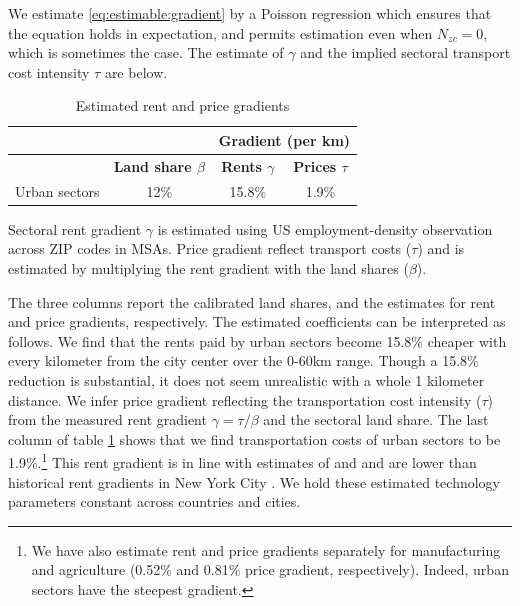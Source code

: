 \documentclass[12pt]{article}
\begin{document}
We estimate \eqref{eq:estimable:gradient} by a Poisson regression which ensures that the equation holds in expectation, and permits estimation even when $N_{zc}=0$, which is sometimes the case. The estimate of $\gamma$ and the implied sectoral transport cost intensity $\tau$ are below.

\begin{table}[h!]
  \begin{center}
  \caption{Estimated rent and price gradients}
    \begin{tabular}{rccc}
    \toprule
    \textbf{} & \textbf{} & \multicolumn{2}{c}{\textbf{Gradient (per km)}}\\
    \midrule
    \textbf{} & \textbf{Land share $\beta$ } & \textbf{Rents $\gamma$} & \textbf{Prices $\tau$} \\
    Urban sectors & 12\%  & 15.8\% & 1.9\% \\
    \bottomrule
    \end{tabular}%

  \end{center}
  \label{tab:EmpGrad}%

  \noindent \footnotesize{Sectoral rent gradient $\gamma$ is estimated using US employment-density observation across ZIP codes in MSAs. Price gradient reflect transport costs ($\tau$) and is estimated by multiplying the rent gradient with the land shares ($\beta$). }
\end{table}%

The three columns report the calibrated land shares, and the estimates for rent and price gradients, respectively. The estimated coefficients can be interpreted as follows. We find that the rents paid by urban sectors become 15.8\% cheaper with every kilometer from the city center over the 0-60km range. Though a 15.8\% reduction is substantial, it does not seem unrealistic with a whole 1 kilometer distance. We infer price gradient reflecting the transportation cost intensity ($\tau$) from the measured rent gradient $\gamma=\tau/\beta$ and the sectoral land share. The last column of table \ref{tab:EmpGrad} shows that we find transportation costs of urban sectors to be 1.9\%.\footnote{We have also estimate rent and price gradients separately for manufacturing and agriculture (0.52\% and 0.81\% price gradient, respectively). Indeed, urban sectors have the steepest gradient.} This rent gradient is in line with estimates of  and  and are lower than historical rent gradients in New York City \cite{Atack1998}. We hold these estimated technology parameters constant across countries and cities.
\end{document}
